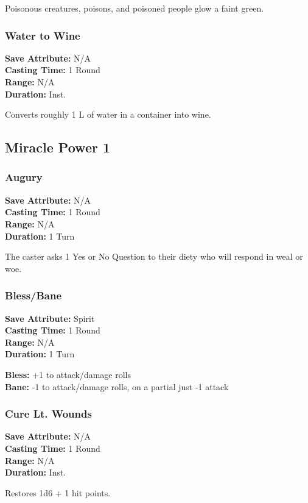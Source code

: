 \begin{multicols}{2}
Poisonous creatures, poisons, and poisoned people glow a faint green.

\subsubsection*{Water to Wine}
\begin{mercClassInfo}
\textbf{Save Attribute:} N/A\\
\textbf{Casting Time:} 1 Round\\
\textbf{Range:} N/A\\
\textbf{Duration:} Inst.
\end{mercClassInfo}

Converts roughly 1 L of water in a container into wine.

\subsection*{Miracle Power 1}

\subsubsection*{Augury}
\begin{mercClassInfo}
\textbf{Save Attribute:} N/A\\
\textbf{Casting Time:} 1 Round\\
\textbf{Range:} N/A\\
\textbf{Duration:} 1 Turn
\end{mercClassInfo}

The caster asks 1 Yes or No Question to their diety who will respond in weal or woe.

\subsubsection*{Bless/Bane}
\begin{mercClassInfo}
\textbf{Save Attribute:} Spirit\\
\textbf{Casting Time:} 1 Round\\
\textbf{Range:} N/A\\
\textbf{Duration:} 1 Turn
\end{mercClassInfo}

\textbf{Bless:} +1 to attack/damage rolls \\
\textbf{Bane:} -1 to attack/damage rolls, on a partial just -1 attack
\subsubsection*{Cure Lt. Wounds}
\begin{mercClassInfo}
\textbf{Save Attribute:} N/A\\
\textbf{Casting Time:} 1 Round\\
\textbf{Range:} N/A\\
\textbf{Duration:} Inst.
\end{mercClassInfo}

Restores 1d6 + 1 hit points.

\end{multicols}